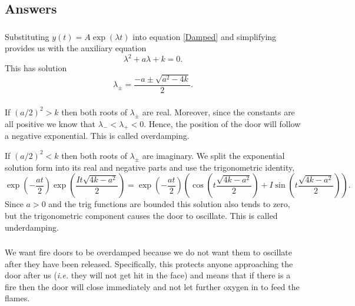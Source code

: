 \documentclass[10pt]{article}
\newcommand{\bb}{\begin{equation}}
\newcommand{\ee}{\end{equation}}
\newcommand{\eqn}[1]{equation \eqref{#1}}
\newcommand{\ie}{\emph{i.e.} }
\renewcommand{\l}{\left(}
\renewcommand{\r}{\right)}
\begin{document}
\begin{Answ}
\subsection{Answers}
\subsubsection{}
Substituting $y(t)=A\exp(\lambda t)$ into \eqn{Damped} and simplifying provides us with the auxiliary equation
\bb
\lambda^2+a\lambda+k=0.
\ee
This has solution
\bb
\lambda_\pm=\frac{-a\pm\sqrt{a^2-4k}}{2}.
\ee
\subsubsection{}
If $\l a/2\r^2>k$ then both roots of $\lambda_\pm$ are real. Moreover, since the constants are all positive we know that $\lambda_-<\lambda_+<0$. Hence, the position of the door will follow a negative exponential. This is called overdamping.

If $\l a/2\r^2<k$ then both roots of $\lambda_\pm$ are imaginary. We split the exponential solution form into its real and negative parts and use the trigonometric identity,
\bb
\exp\l-\frac{at}{2}\r\exp\l\frac{It\sqrt{4k-a^2}}{2}\r=\exp\l-\frac{at}{2}\r\l\cos\l t\frac{\sqrt{4k-a^2}}{2}\r+I\sin\l t\frac{\sqrt{4k-a^2}}{2}\r\r.
\ee
Since $a>0$ and the trig functions are bounded this solution also tends to zero, but the trigonometric component causes the door to oscillate. This is called underdamping.

\subsubsection{}
We want fire doors to be overdamped because we do not want them to oscillate after they have been released. Specifically, this protects anyone approaching the door after us (\ie they will not get hit in the face) and means that if there is a fire then the door will close immediately and not let further oxygen in to feed the flames.
\end{Answ}
\end{document}
